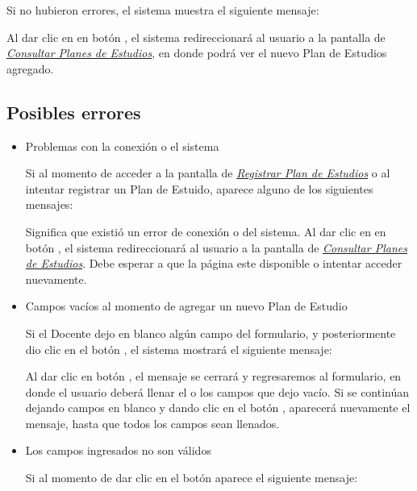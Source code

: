 Si no hubieron errores, el sistema muestra el siguiente mensaje:

Al dar clic en en botón , el sistema redireccionará al usuario a la pantalla de \hyperlink{consultarPE}{\textit{Consultar Planes de Estudios}}, en donde podrá ver el nuevo Plan de Estudios agregado.\\
\newpage
\subsection{Posibles errores}
\begin{itemize}

    \item Problemas con la conexión o el sistema

    Si al momento de acceder a la pantalla de \hyperlink{registrarPE}{\textit{Registrar Plan de Estudios}} o al intentar registrar un Plan de Estuido, aparece alguno de los siguientes mensajes:

    Significa que existió un error de conexión o del sistema. Al dar clic en en botón , el sistema redireccionará al usuario a la pantalla de \hyperlink{consultarPE}{\textit{Consultar Planes de Estudios}}. Debe esperar a que la página este disponible o intentar acceder nuevamente.

    \item Campos vacíos al momento de agregar un nuevo Plan de Estudio

    Si el Docente dejo en blanco algún campo del formulario, y posteriormente dio clic en el botón , el sistema mostrará el siguiente mensaje:

    Al dar clic en botón , el mensaje se cerrará y regresaremos al formulario, en donde el usuario deberá llenar el o los campos que dejo vacío. Si se continúan dejando campos en blanco y dando clic en el botón , aparecerá nuevamente el mensaje, hasta que todos los campos sean llenados.\\



    \item Los campos ingresados no son válidos

    Si al momento de dar clic en el botón  aparece el siguiente mensaje:


\end{itemize}
